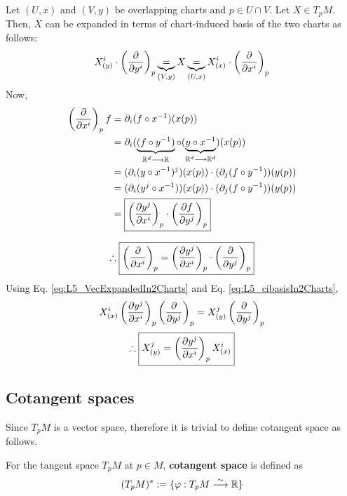 Let $(U,x)$ and $(V,y)$ be overlapping charts and $p \in U \cap V$. Let $X \in T_pM$. Then, $X$ can be expanded in terms of chart-induced basis of the two charts as follows:
\begin{equation}\label{eq:L5_VecExpandedIn2Charts}
X^i_{(y)} \cdot \left(\cibasis{y^i}\right)_p \underbrace{=}_{(V,y)} X \underbrace{=}_{(U,x)} X^i_{(x)} \cdot \left(\cibasis{x^i}\right)_p
\end{equation}
Now,
\begin{align*}
  \left(\cibasis{x^i}\right)_p f & = \partial_i(f \after x^{-1})(x(p)) \\
  & = \partial_i (\underbrace{(f \after y^{-1})}_{\mathbb{R}^d \to \mathbb{R}} \after (\underbrace{y \after x^{-1}}_{\mathbb{R}^d \to \mathbb{R}^d})(x(p)) \\
  & = (\partial_i (y \after x^{-1})^j)(x(p)) \cdot (\partial_j (f \after y^{-1}))(y(p)) \\
  & = (\partial_i (y^j \after x^{-1}))(x(p)) \cdot (\partial_j (f \after y^{-1}))(y(p)) \\
  & = \boxed{\left(\cibasis[y^j]{x^i}\right)_p \cdot \left(\cibasis[f]{y^j}\right)_p}
\end{align*}

\begin{equation}\label{eq:L5_cibasisIn2Charts}
\therefore \boxed{\left(\cibasis{x^i}\right)_p = \left(\cibasis[y^j]{x^i}\right)_p \cdot \left(\cibasis{y^j}\right)_p}
\end{equation}
Using Eq. \ref{eq:L5_VecExpandedIn2Charts} and Eq. \ref{eq:L5_cibasisIn2Charts}, 
\[
  X^i_{(x)} \left(\cibasis[y^j]{x^i}\right)_p \left(\cibasis{y^j}\right)_p = X^j_{(y)}\left(\cibasis{y^j}\right)_p
\]
\begin{equation}
\therefore \boxed{X^j_{(y)} = \left(\cibasis[y^j]{x^i}\right)_p X^i_{(x)}}
\end{equation}

\subsection{Cotangent spaces}
Since $T_pM$ is a vector space, therefore it is trivial to define cotangent space as follows.

\begin{definition}
For the tangent space $T_pM$ at $p \in M$, \textbf{cotangent space} is defined as
\begin{equation}
(T_pM)^* := \lbrace \varphi : T_pM \linearmapto \mathbb{R} \rbrace
\end{equation}
\end{definition}

